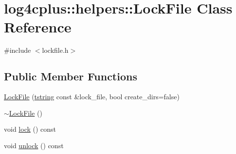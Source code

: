 \hypertarget{classlog4cplus_1_1helpers_1_1LockFile}{\section{log4cplus\-:\-:helpers\-:\-:Lock\-File Class Reference}
\label{classlog4cplus_1_1helpers_1_1LockFile}
}


{\ttfamily \#include $<$lockfile.\-h$>$}

\subsection*{Public Member Functions}
\begin{DoxyCompactItemize}
\item 
\hyperlink{classlog4cplus_1_1helpers_1_1LockFile_a4a2b597a86b9222a8091500e9828c284}{Lock\-File} (\hyperlink{namespacelog4cplus_a3c9287f6ebcddc50355e29d71152117b}{tstring} const \&lock\-\_\-file, bool create\-\_\-dirs=false)
\item 
\hyperlink{classlog4cplus_1_1helpers_1_1LockFile_af9504900440810361c5164ef9abce4e1}{$\sim$\-Lock\-File} ()
\item 
void \hyperlink{classlog4cplus_1_1helpers_1_1LockFile_ab78589dd0480439b7a119ef9433d1224}{lock} () const 
\item 
void \hyperlink{classlog4cplus_1_1helpers_1_1LockFile_a3f8faf7b9734f9b487e4fa9c5089bc78}{unlock} () const 
\end{DoxyCompactItemize}


